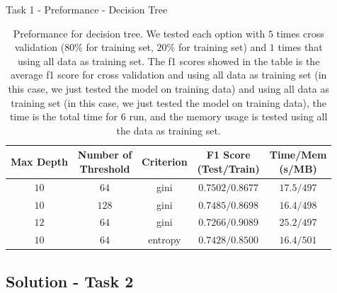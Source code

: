 \documentclass{beamer}
\begin{document}
\begin{frame}{Task 1 - Preformance - Decision Tree}

  \begin{table}[H]
    \centering
    \begin{tabular}{|c|c|c|c|c|}
      \hline
      Max Depth & \makecell{Number of                                          \\ Threshold} & Criterion & \makecell{F1 Score \\ (Test/Train)} & \makecell{Time/Mem \\ (s/MB)}               \\
      \hline
      $10$      & $64$                & gini    & $0.7502/0.8677$ & $17.5/497$ \\
      \hline
      $10$      & $128$               & gini    & $0.7485/0.8698$ & $16.4/498$ \\
      \hline
      $12$      & $64$                & gini    & $0.7266/0.9089$ & $25.2/497$ \\
      \hline
      $10$      & $64$                & entropy & $0.7428/0.8500$ & $16.4/501$ \\
      \hline
    \end{tabular}
    \caption{Preformance for decision tree. We tested each option with $5$ times cross validation ($80\%$ for training set, $20\%$ for training set) and $1$ times that using all data as training set. The f1 scores showed in the table is the average f1 score for cross validation and using all data as training set (in this case, we just tested the model on training data) and using all data as training set (in this case, we just tested the model on training data), the time is the total time for $6$ run, and the memory usage is tested using all the data as training set.}
  \end{table}

\end{frame}

\subsection{Solution - Task 2}
\end{document}
